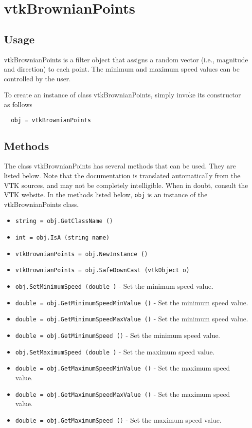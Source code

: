 \section{vtkBrownianPoints}

\subsection{Usage}

 vtkBrownianPoints is a filter object that assigns a random vector (i.e.,
 magnitude and direction) to each point. The minimum and maximum speed
 values can be controlled by the user.

To create an instance of class vtkBrownianPoints, simply
invoke its constructor as follows
\begin{verbatim}
  obj = vtkBrownianPoints
\end{verbatim}
\subsection{Methods}

The class vtkBrownianPoints has several methods that can be used.
  They are listed below.
Note that the documentation is translated automatically from the VTK sources,
and may not be completely intelligible.  When in doubt, consult the VTK website.
In the methods listed below, \verb|obj| is an instance of the vtkBrownianPoints class.
\begin{itemize}
\item  \verb|string = obj.GetClassName ()|

\item  \verb|int = obj.IsA (string name)|

\item  \verb|vtkBrownianPoints = obj.NewInstance ()|

\item  \verb|vtkBrownianPoints = obj.SafeDownCast (vtkObject o)|

\item  \verb|obj.SetMinimumSpeed (double )| -  Set the minimum speed value.

\item  \verb|double = obj.GetMinimumSpeedMinValue ()| -  Set the minimum speed value.

\item  \verb|double = obj.GetMinimumSpeedMaxValue ()| -  Set the minimum speed value.

\item  \verb|double = obj.GetMinimumSpeed ()| -  Set the minimum speed value.

\item  \verb|obj.SetMaximumSpeed (double )| -  Set the maximum speed value.

\item  \verb|double = obj.GetMaximumSpeedMinValue ()| -  Set the maximum speed value.

\item  \verb|double = obj.GetMaximumSpeedMaxValue ()| -  Set the maximum speed value.

\item  \verb|double = obj.GetMaximumSpeed ()| -  Set the maximum speed value.

\end{itemize}
